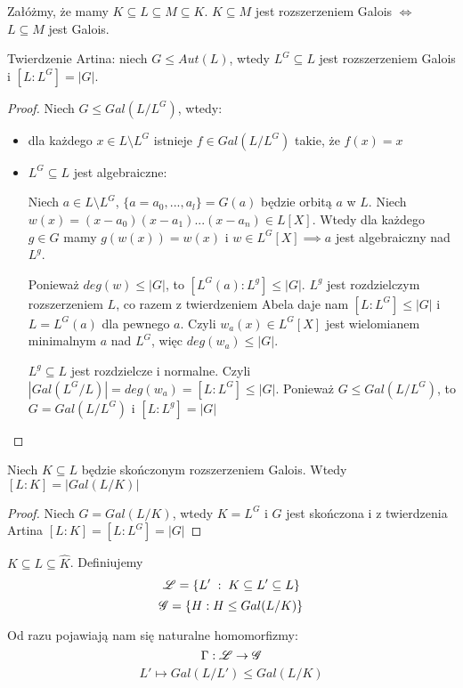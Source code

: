 \begin{conclusion}
Załóżmy, że mamy $K\subseteq L\subseteq M\subseteq K$. $K\subseteq M$ jest rozszerzeniem Galois $\iff$ $L\subseteq M$ jest Galois.
\end{conclusion}

\begin{theorem}[Artin]
Twierdzenie Artina: niech $G\leq Aut(L)$, wtedy $L^G\subseteq L$ jest rozszerzeniem Galois i $[L:L^G]=|G|$.
\end{theorem}
\begin{proof}
Niech $G\leq Gal(L/L^G)$, wtedy:
\begin{itemize}
    \item dla każdego $x\in L\setminus L^G$ istnieje $f\in Gal(L/L^G)$ takie, że $f(x)=x$
    \item $L^G\subseteq L$ jest algebraiczne:

    Niech $a\in L\setminus L^G$, $\{a=a_0,...,a_l\}=G(a)$ będzie orbitą $a$ w $L$. Niech $w(x)=(x-a_0)(x-a_1)...(x-a_n)\in L[X]$. Wtedy dla każdego $g\in G$ mamy $g(w(x))=w(x)$ i $w\in L^G[X]\implies a$ jest algebraiczny nad $L^g$.

    Ponieważ $deg(w)\leq |G|$, to $[L^G(a):L^g]\leq |G|$. $L^g$ jest rozdzielczym rozszerzeniem $L$, co razem z twierdzeniem Abela daje nam $[L:L^G]\leq |G|$ i $L=L^G(a)$ dla pewnego $a$. Czyli $w_a(x)\in L^G[X]$ jest wielomianem minimalnym $a$ nad $L^G$, więc $deg(w_a)\leq|G|$. 

    $L^g\subseteq L$ jest rozdzielcze i normalne. Czyli $|Gal(L^G/L)|=deg(w_a)=[L:L^G]\leq|G|$. Ponieważ $G\leq Gal(L/L^G)$, to $G=Gal(L/L^G)$ i $[L:L^g]=|G|$
\end{itemize}
\end{proof}

\begin{conclusion}
Niech $K\subseteq L$ będzie skończonym rozszerzeniem Galois. Wtedy $[L:K]=|Gal(L/K)|$
\end{conclusion}

\begin{proof}
Niech $G=Gal(L/K)$, wtedy $K=L^G$ i $G$ jest skończona i z twierdzenia Artina $[L:K]=[L:L^G]=|G|$
\end{proof}

\begin{bbox}
$K\subseteq L\subseteq\hat{K}$. Definiujemy
$$\mathcal{L}=\{L'\;:\;K\subseteq L'\subseteq L\}$$
$$\mathcal{G}=\{H:H\leq Gal(L/K)\}$$
\end{bbox}

Od razu pojawiają nam się naturalne homomorfizmy:
$$\Gamma:\mathcal{L}\to\mathcal{G}$$
$$L'\mapsto Gal(L/L')\leq Gal(L/K)$$

